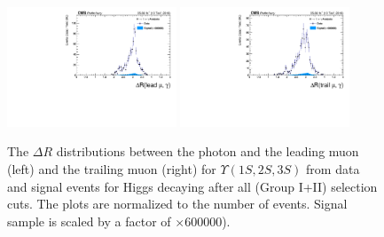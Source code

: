 \begin{figure}[!htbp]
\begin{center}
\includegraphics[width=0.45\textwidth]{figures_and_tables/outputPlots/HtoUpsilon_Cat0_ZZZZZ/nEvts/data_x_mc/withKinCuts/h_withKin_deltaR_Leading_Photon}\hspace*{1.cm}
\includegraphics[width=0.45\textwidth]{figures_and_tables/outputPlots/HtoUpsilon_Cat0_ZZZZZ/nEvts/data_x_mc/withKinCuts/h_withKin_deltaR_Trailing_Photon}\end{center}\vspace*{-.5cm}
\caption{The $\Delta R$ distributions between the photon and the leading muon (left) and the trailing muon (right) for $\Upsilon(1S,2S,3S)$ from data and signal events for Higgs decaying after all (Group I+II) selection cuts. The plots are normalized to the number of events. Signal sample is scaled by a factor of $\times 600000$).}
\label{fig:deltaR_HtoUpsilon_Cat0_groupI_plus_II}
\end{figure}


